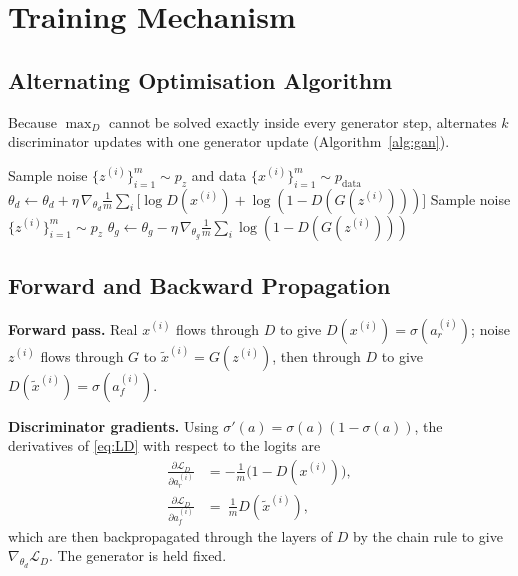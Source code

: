 \documentclass[conference]{IEEEtran}
\newcommand{\pdata}{p_{\mathrm{data}}}
\newcommand{\pz}{p_{z}}
\newcommand{\thg}{\theta_g}
\newcommand{\thd}{\theta_d}
\theoremstyle{plain}
\theoremstyle{definition}
\begin{document}
\section{Training Mechanism}\label{sec:train}

\subsection{Alternating Optimisation Algorithm}
Because $\max_D$ cannot be solved exactly inside every generator step, \cite{goodfellow2014gan} alternates $k$ discriminator updates with one generator update (Algorithm~\ref{alg:gan}).

\begin{algorithm}[t]
\caption{Minibatch SGD training of GANs \cite{goodfellow2014gan}}
\label{alg:gan}
\begin{algorithmic}[1]
    \State Sample noise $\{z^{(i)}\}_{i=1}^m\sim\pz$ and data $\{x^{(i)}\}_{i=1}^m\sim\pdata$
    \State $\thd\leftarrow\thd+\eta\,\nabla_{\thd}\frac1m\sum_i\big[\log D(x^{(i)})+\log(1-D(G(z^{(i)})))\big]$
  \EndFor
  \State Sample noise $\{z^{(i)}\}_{i=1}^m\sim\pz$
  \State $\thg\leftarrow\thg-\eta\,\nabla_{\thg}\frac1m\sum_i\log(1-D(G(z^{(i)})))$ 
\EndFor
\end{algorithmic}
\end{algorithm}

\subsection{Forward and Backward Propagation}
\textbf{Forward pass.} Real $x^{(i)}$ flows through $D$ to give $D(x^{(i)})=\sigma(a_r^{(i)})$; noise $z^{(i)}$ flows through $G$ to $\tilde x^{(i)}=G(z^{(i)})$, then through $D$ to give $D(\tilde x^{(i)})=\sigma(a_f^{(i)})$.

\textbf{Discriminator gradients.} Using $\sigma'(a)=\sigma(a)(1-\sigma(a))$, the derivatives of \eqref{eq:LD} with respect to the logits are
\begin{align}
\frac{\partial\mathcal{L}_D}{\partial a_r^{(i)}}&=-\frac1m\big(1-D(x^{(i)})\big),\\
\frac{\partial\mathcal{L}_D}{\partial a_f^{(i)}}&=\ \frac1m D(\tilde x^{(i)}),
\end{align}
which are then backpropagated through the layers of $D$ by the chain rule to give $\nabla_{\thd}\mathcal{L}_D$. The generator is held fixed.
\end{document}
